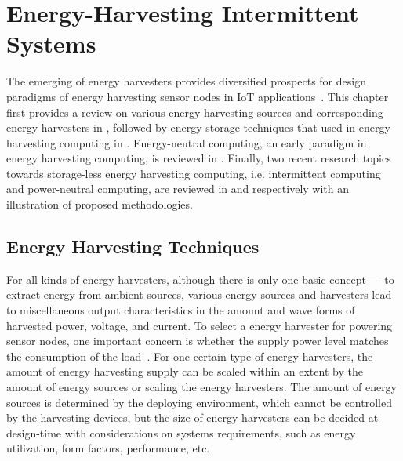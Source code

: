 \chapter{Energy-Harvesting Intermittent Systems} \label{Chapter:Review}

The emerging of energy harvesters provides diversified prospects for design paradigms of energy harvesting sensor nodes in IoT applications~\cite{miorandi2012internet}. This chapter first provides a review on various energy harvesting sources and corresponding energy harvesters in , followed by energy storage techniques that used in energy harvesting computing in . Energy-neutral computing, an early paradigm in energy harvesting computing, is reviewed in . Finally, two recent research topics towards storage-less energy harvesting computing, i.e. intermittent computing and power-neutral computing, are reviewed in  and  respectively with an illustration of proposed methodologies.

\section{Energy Harvesting Techniques} \label{Section:EH}

For all kinds of energy harvesters, although there is only one basic concept --- to extract energy from ambient sources, various energy sources and harvesters lead to miscellaneous output characteristics in the amount and wave forms of harvested power, voltage, and current. To select a energy harvester for powering sensor nodes, one important concern is whether the supply power level matches the consumption of the load~\cite{shaikh2016energy}. For one certain type of energy harvesters, the amount of energy harvesting supply can be scaled within an extent by the amount of energy sources or scaling the energy harvesters. The amount of energy sources is determined by the deploying environment, which cannot be controlled by the harvesting devices, but the size of energy harvesters can be decided at design-time with considerations on systems requirements, such as energy utilization, form factors, performance, etc. 

